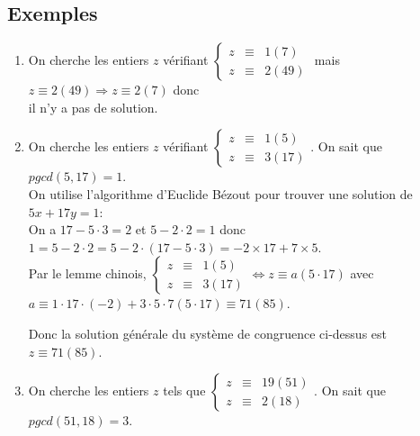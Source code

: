 \documentclass[a4paper,10pt]{book} %
\begin{document}
\subsection{Exemples}
\begin{enumerate}
\item On cherche les entiers $z$ vérifiant $\left\{\begin{array}{rcl}z&\equiv &1(7) \\ z&\equiv &2(49)\end{array}
\right.$
mais $z\equiv2(49)\Rightarrow z\equiv 2(7)$ donc \\il n'y a pas de solution.\\

\item On cherche les entiers $z$ vérifiant $\left\{\begin{array}{rcl} z&\equiv &1(5) \\ z&\equiv &3(17) \end{array}\right.$. On sait que $pgcd(5,17)=1$.\\

On utilise l'algorithme d'Euclide Bézout pour trouver une solution de $5x+17y=1$:\\
On a $17-5\cdot 3=2$ et $5-2\cdot 2=1$ donc $1=5-2\cdot 2=5-2\cdot (17-5\cdot 3)=-2\times 17+7\times 5$.\\

Par le lemme chinois, $\left\{\begin{array}{rcl}
z&\equiv &1(5) \\ z&\equiv &3 (17) \end{array}\right.\Leftrightarrow z\equiv a (5\cdot 17)$ avec $a\equiv 1\cdot 17\cdot (-2) +3\cdot 5\cdot 7(5\cdot 17)\equiv 71(85)$.

Donc la solution générale du système de congruence ci-dessus est $z\equiv  71(85)$.\\

\item On cherche les entiers $z$ tels que $\left\{\begin{array}{rcl}
z&\equiv &19(51) \\ z&\equiv &2 (18)
\end{array}\right.$. On sait que $pgcd(51,18)=3$.\\


\end{enumerate}
\end{document}
